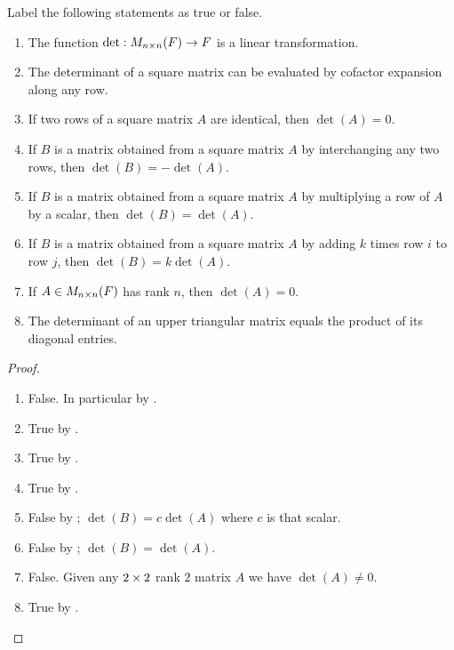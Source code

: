 \exercisesection

\begin{exercise} \label{exercise 4.2.1}
Label the following statements as true or false.
\begin{enumerate}
\item The function \(\det: M_{n \times n}(F) \to F\) is a linear transformation.
\item The determinant of a square matrix can be evaluated by cofactor expansion along any row.
\item If two rows of a square matrix \(A\) are identical, then \(\det(A) = 0\).
\item If \(B\) is a matrix obtained from a square matrix \(A\) by interchanging any two rows, then \(\det(B) = -\det(A)\).
\item If \(B\) is a matrix obtained from a square matrix \(A\) by multiplying a row of \(A\) by a scalar, then \(\det(B) = \det(A)\).
\item If \(B\) is a matrix obtained from a square matrix \(A\) by adding \(k\) times row \(i\) to row \(j\), then \(\det(B) = k\det(A)\).
\item If \(A \in M_{n \times n}(F)\) has rank \(n\), then \(\det(A) = 0\).
\item The determinant of an upper triangular matrix equals the product of its diagonal entries.
\end{enumerate} 
\end{exercise}

\begin{proof} \ 

\begin{enumerate}
\item False. In particular by .
\item True by .
\item True by .
\item True by .
\item False by ; \(\det(B) = c \det(A)\) where \(c\) is that scalar.
\item False by ; \(\det(B) = \det(A)\).
\item False. Given any \(2 \times 2\) rank \(2\) matrix \(A\) we have \(\det(A) \ne 0\).
\item True by .
\end{enumerate}
\end{proof}

